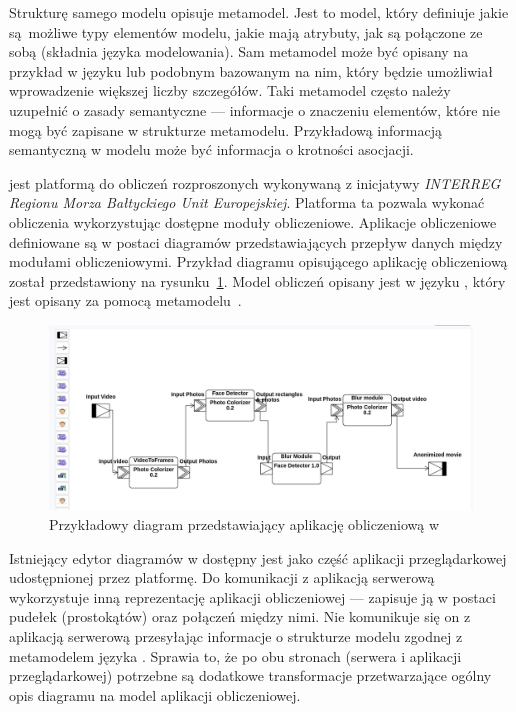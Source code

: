 Strukturę samego modelu opisuje metamodel. Jest to model, który definiuje jakie
są~możliwe typy elementów modelu, jakie mają atrybuty, jak są połączone ze
sobą (składnia języka modelowania). Sam metamodel może być opisany na przykład
w języku  lub podobnym
bazowanym na nim, który będzie umożliwiał wprowadzenie większej liczby
szczegółów. Taki metamodel często należy uzupełnić o zasady semantyczne ---
informacje o znaczeniu elementów, które nie mogą być zapisane w strukturze
metamodelu. Przykładową informacją semantyczną w modelu  może być
informacja o krotności asocjacji.

\BalticLSC{} jest platformą do obliczeń rozproszonych wykonywaną z
inicjatywy
\emph{INTERREG Regionu Morza Bałtyckiego Unit Europejskiej}. Platforma ta
pozwala
wykonać obliczenia wykorzystując dostępne moduły obliczeniowe. Aplikacje
obliczeniowe definiowane są w postaci diagramów przedstawiających przepływ
danych między modułami obliczeniowymi. Przykład diagramu opisującego aplikację
obliczeniową został przedstawiony na
rysunku~\ref{rys:przykladowy-diagram-balticlsc}.  Model obliczeń opisany jest w
języku , który jest opisany za pomocą
metamodelu~\cite{cal-metamodel}.

\begin{figure}[!ht]
	\centering

	\includegraphics[width=0.95\linewidth]{./images/balticlsc-example-diagram.png}
	\caption{Przykładowy diagram przedstawiający aplikację obliczeniową w
		\BalticLSC{}}\label{rys:przykladowy-diagram-balticlsc}
\end{figure}

Istniejący edytor diagramów w \BalticLSC{} dostępny jest jako część aplikacji
przeglądarkowej udostępnionej przez platformę. Do komunikacji z aplikacją
serwerową wykorzystuje inną reprezentację aplikacji obliczeniowej --- zapisuje
ją w postaci pudełek (prostokątów) oraz połączeń między nimi. Nie komunikuje
się on z aplikacją serwerową przesyłając informacje o strukturze modelu
zgodnej z metamodelem języka \CAL{}. Sprawia to, że po obu stronach (serwera
i aplikacji przeglądarkowej) potrzebne są dodatkowe transformacje
przetwarzające ogólny opis diagramu na model aplikacji obliczeniowej.


